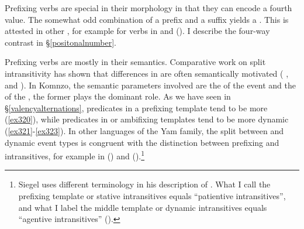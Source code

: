 
Prefixing verbs are special in their morphology in that they can encode a fourth  value. The somewhat odd combination of a  prefix and a  suffix yields a . This is attested in other , for example for  verbs in  and  (\citealt{Evans:2014bz}). I describe the four-way  contrast in \S{}\ref{positonalnumber}.%

Prefixing verbs are mostly  in their semantics. Comparative work on split intransitivity has shown that differences in  are often semantically motivated ( \citealt{Merlan:1985tu}, \citealt{Mithun:1991wu} and \citealt{Arkadiev:2008vq}). In Komnzo, the semantic parameters involved are the  of the event and the  of the , the former plays the dominant role. As we have seen in \S\ref{valencyalternations}, predicates in a prefixing template tend to be more  (\ref{ex320}), while predicates in  or ambifixing templates tend to be more dynamic (\ref{ex321}-\ref{ex323}). In other languages of the Yam family, the split between  and dynamic event types is congruent with the distinction between prefixing and  intransitives, for example in  (\citealt{Evans:2015to}) and  (\citealt{Siegel:2015bp}).\footnote{Siegel uses different terminology in his description of . What I call the prefixing template or stative intransitives equals ``patientive intransitives'', and what I label the middle template or dynamic intransitives equals ``agentive intransitives'' (\citealt[213]{Siegel:2015bp}).}%


